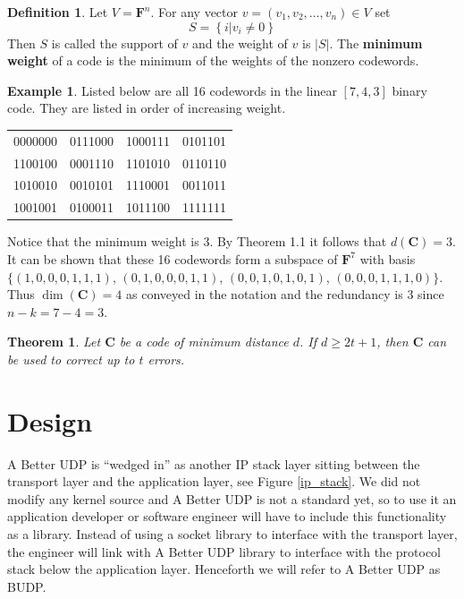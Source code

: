 \documentclass[conference]{IEEEtran}
\newtheorem{theorem}[thm]{Theorem}
\theoremstyle{definition}
\newtheorem{definition}[thm]{Definition}
\newtheorem{example}[thm]{Example}
\begin{document}
\begin{definition}
Let $V=\mathbf{F}^n$.  For any vector $v=(v_1,v_2,\ldots,v_n)\in V$
set
$$
S=\left\{i|v_i\neq 0\right\}
$$
Then $S$ is called the support of $v$ and the weight of $v$ is
$\left|S\right|$.  The {\bf minimum weight} of a code is the
minimum of the weights of the nonzero codewords.
\end{definition}


\begin{example}\label{hamming}
Listed below are all 16 codewords in the linear $[7,4,3]$
binary code.  They are listed in order of increasing weight.\\

\begin{center}
 \begin{tabular}{cccc}
  0000000 & 0111000 & 1000111 & 0101101\\
  1100100 & 0001110 & 1101010 & 0110110\\
  1010010 & 0010101 & 1110001 & 0011011\\
  1001001 & 0100011 & 1011100 & 1111111\\
 \end{tabular}
\end{center}

Notice that the minimum weight is 3.  By Theorem 1.1 it
follows that $d(\mathbf{C}) = 3$.  It can be shown
that these 16 codewords form a subspace of $\mathbf{F}^7$
with basis $\{(1,0,0,0,1,1,1)$, $(0,1,0,0,0,1,1)$, 
$(0,0,1,0,1,0,1)$, $(0,0,0,1,1,1,0)\}$. Thus 
$\dim(\mathbf{C})=4$ as conveyed in the notation and the
redundancy is 3 since $n-k=7-4 = 3$.
\end{example}



\begin{theorem}
Let $\mathbf{C}$ be a code of minimum distance $d$.  If
$d\geq2t+1$, then $\mathbf{C}$ can be used to correct up
to $t$ errors.
\end{theorem}


\section{Design}
A Better UDP is ``wedged in'' as another IP stack
layer sitting between the transport layer and the application
layer, see Figure \ref{ip_stack}.  We did not modify any
kernel source and A Better UDP is not a standard yet, so
to use it an application developer or software engineer
will have to include this functionality as a library.
Instead of using a socket library to interface
with the transport layer, the engineer will link with
A Better UDP library to interface with the protocol stack
below the application layer. Henceforth we will refer
to A Better UDP as BUDP.
\end{document}
